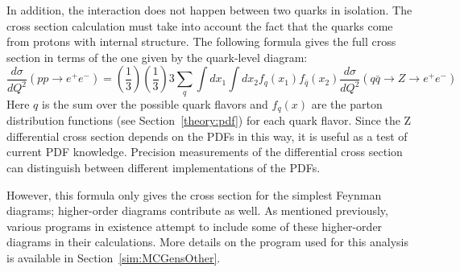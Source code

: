 In addition, 
the interaction does not happen 
between two quarks in isolation.  
The cross section calculation must take 
into account the fact that the quarks come from 
protons with internal structure.  
The following formula gives the full cross section 
in terms of the one given by the quark-level diagram: 
\[
\frac{d \sigma}{d Q^2}(pp \rightarrow e^+ e^- )
= \left( \frac{1}{3} \right) \left( \frac{1}{3} \right) 3 
\sum_q \int dx_1 \int dx_2 f_q (x_1) f_{\bar{q}} (x_2)
\frac{d \sigma }{d Q^2}
( q \bar{q} \rightarrow Z \rightarrow e^+ e^- )
\]
Here $q$ is the sum over the possible quark flavors 
and $f_q(x)$ are the parton distribution functions 
(see Section~\ref{theory:pdf}) for each quark flavor.  
Since the Z differential cross section depends 
on the PDFs in this way, 
it is useful as a test of current PDF knowledge.  
Precision measurements of the differential cross section 
can distinguish between different implementations 
of the PDFs.  




However, this formula only gives the cross section 
for the simplest Feynman diagrams; 
higher-order diagrams contribute as well.  
As mentioned previously, various programs 
in existence attempt to include some of these higher-order 
diagrams in their calculations.  
More details on the program used for this analysis 
is available in 
Section~\ref{sim:MCGensOther}. 





